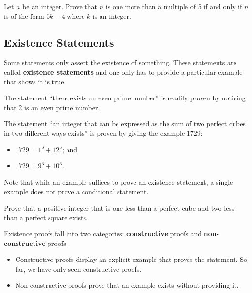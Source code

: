 \begin{exercise}
    Let $n$ be an integer. Prove that $n$ is one more than a multiple of 5 if and only if $n$ is of the form $5k - 4$ where $k$ is an integer.
\end{exercise}

\subsection{Existence Statements}
Some statements only assert the existence of something. These statements are called \textbf{existence statements} and one only has to provide a particular example that shows it is true. 
\begin{example}
    The statement ``there exists an even prime number'' is readily proven by noticing that 2 is an even prime number.
\end{example}
\begin{example}
    The statement ``an integer that can be expressed as the sum of two perfect cubes in two different ways exists'' is proven by giving the example 1729:
    \begin{itemize}
        \item $1729 = 1^3 + 12^3$; and
        \item $1729 = 9^3 + 10^3$.
    \end{itemize}
\end{example}
Note that while an example suffices to prove an existence statement, a single example does not prove a conditional statement.
\begin{exercise}
    Prove that a positive integer that is one less than a perfect cube and two less than a perfect square exists.
\end{exercise}
Existence proofs fall into two categories: \textbf{constructive} proofs and \textbf{non-constructive} proofs.
\begin{itemize}
    \item Constructive proofs display an explicit example that proves the statement. So far, we have only seen constructive proofs.
    \item Non-constructive proofs prove that an example exists without providing it.
\end{itemize}

